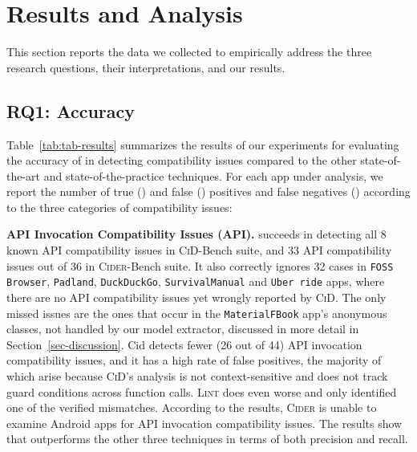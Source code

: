 

\section{Results and Analysis}
\label{sec-results}

 
This section reports the data we collected to empirically address the three research questions, their interpretations, and our results.

\subsection{RQ1: Accuracy}


Table~\ref{tab:tab-results} summarizes the results of our
experiments for evaluating the accuracy of \@approach in
detecting compatibility issues compared to the other
state-of-the-art and state-of-the-practice techniques.  For
each app under analysis, we report the number of true (\tp)
and false (\fp) positives and false negatives (\fn)
according to the three categories of compatibility issues:

\textbf{API Invocation Compatibility Issues (API).}
\@approach succeeds in detecting all 8 known API
compatibility issues in \textsc{CiD}-Bench suite, and 33 API
compatibility issues out of 36 in \textsc{Cider}-Bench
suite.  It also correctly ignores 32 cases in \texttt{FOSS
Browser}, \texttt{Padland}, \texttt{DuckDuckGo},
\texttt{SurvivalManual} and \texttt{Uber~ride} apps, where
there are no API compatibility issues yet wrongly reported
by \textsc{CiD}. The only missed issues are the ones that
occur in the \texttt{MaterialFBook} app's anonymous classes,
not handled by our model extractor, discussed in more detail
in Section~\ref{sec-discussion}.  {\sc Cid} detects fewer
(26 out of 44) API invocation compatibility issues, and it has a high rate of
false positives, the majority of which arise because
\textsc{CiD}'s analysis is not context-sensitive and does
not track guard conditions across function calls.
\textsc{Lint} does even worse and only identified one of the
verified mismatches.  According to the results,
\textsc{Cider} is unable to examine Android apps for API
invocation compatibility issues. The results show that
\@approach outperforms the other three techniques in terms
of both precision and recall.


